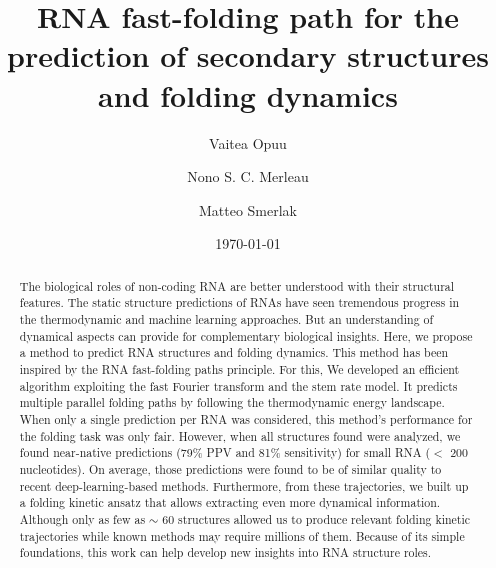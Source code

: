 \documentclass[a4paper,12pt]{article}
\author[1,$\ddagger$]{Vaitea Opuu}
\author[1]{Nono S. C. Merleau}
\author[1]{Matteo Smerlak}
\affil[1]{Max Planck Institute for Mathematics in the Sciences, Leipzig, Germany}
\affil[$\ddagger$]{Contact email: vopuu@mis.mpg.de}
\date{\today}
\title{RNA fast-folding path for the prediction of secondary structures and folding dynamics}
\begin{document}
\maketitle
\begin{abstract}
The biological roles of non-coding RNA are better understood with
their structural features. The static structure predictions of RNAs have seen
tremendous progress in the thermodynamic and machine learning approaches. But an
understanding of dynamical aspects can provide for complementary biological
insights. Here, we propose a method to predict RNA structures and folding
dynamics. This method has been inspired by the RNA fast-folding paths principle.
For this, We developed an efficient algorithm exploiting the fast Fourier
transform and the stem rate model. It predicts multiple parallel folding paths
by following the thermodynamic energy landscape. When only a single prediction
per RNA was considered, this method's performance for the folding task was only
fair. However, when all structures found were analyzed, we found near-native
predictions (79\% PPV and 81\% sensitivity) for small RNA ($\lt$ 200
nucleotides). On average, those predictions were found to be of similar quality
to recent deep-learning-based methods. Furthermore, from these trajectories, we
built up a folding kinetic ansatz that allows extracting even more dynamical
information. Although only as few as $\sim$ 60 structures allowed us to produce
relevant folding kinetic trajectories while known methods may require millions
of them. Because of its simple foundations, this work can help develop new
insights into RNA structure roles.
\end{abstract}
\end{document}
